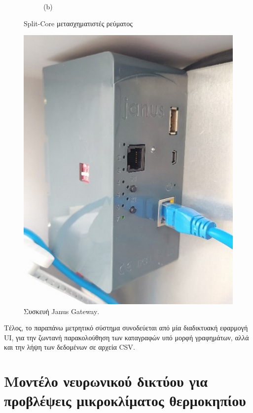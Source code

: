 \documentclass[12pt, a4paper]{report} %
\newcommand{\english}{\foreignlanguage{english}}
\begin{document}
\begin{figure}[ht]
\begin{subfigure}{0.5\textwidth}
        \caption*{(b)}{}
    \end{subfigure}%
    \caption{\english{Split-Core} μετασχηματιστές ρεύματος}
    \label{fig_split_core}
\end{figure}

\begin{figure}[ht]%
    \centering
    \includegraphics[scale=1]{Figures/janus.jpg}
    \caption{Συσκευή \english{Janus Gateway}.}
    \label{fig_janus}
\end{figure}

Τέλος, το παραπάνω μετρητικό σύστημα συνοδεύεται από μία διαδικτυακή εφαρμογή \english{UI}, για την ζωντανή 
παρακολούθηση των καταγραφών υπό μορφή γραφημάτων, αλλά και την λήψη των δεδομένων σε αρχεία \english{CSV}. 

\clearpage
\vspace*{6.5cm}
\sloppy
\section{Μοντέλο νευρωνικού δικτύου για προβλέψεις μικροκλίματος θερμοκηπίου}\label{sec_NN_model}
\fussy
\end{document}
